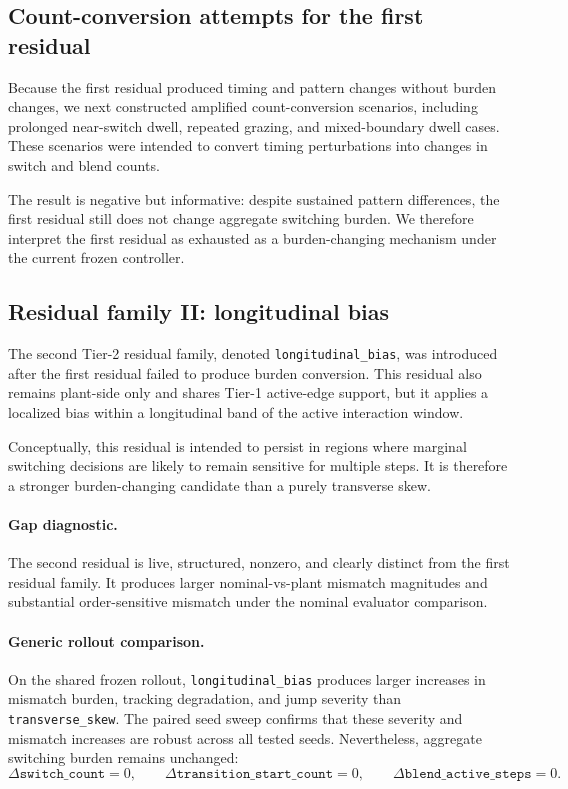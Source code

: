 \subsection{Count-conversion attempts for the first residual}
\label{subsec:tier2_count_conversion_attempt}

Because the first residual produced timing and pattern changes without burden changes, we next constructed amplified count-conversion scenarios, including prolonged near-switch dwell, repeated grazing, and mixed-boundary dwell cases. These scenarios were intended to convert timing perturbations into changes in switch and blend counts.

The result is negative but informative: despite sustained pattern differences, the first residual still does not change aggregate switching burden. We therefore interpret the first residual as exhausted as a burden-changing mechanism under the current frozen controller.

\subsection{Residual family II: longitudinal bias}
\label{subsec:tier2_longitudinal_bias}

The second Tier-2 residual family, denoted \texttt{longitudinal\_bias}, was introduced after the first residual failed to produce burden conversion. This residual also remains plant-side only and shares Tier-1 active-edge support, but it applies a localized bias within a longitudinal band of the active interaction window.

Conceptually, this residual is intended to persist in regions where marginal switching decisions are likely to remain sensitive for multiple steps. It is therefore a stronger burden-changing candidate than a purely transverse skew.

\paragraph{Gap diagnostic.}
The second residual is live, structured, nonzero, and clearly distinct from the first residual family. It produces larger nominal-vs-plant mismatch magnitudes and substantial order-sensitive mismatch under the nominal evaluator comparison.

\paragraph{Generic rollout comparison.}
On the shared frozen rollout, \texttt{longitudinal\_bias} produces larger increases in mismatch burden, tracking degradation, and jump severity than \texttt{transverse\_skew}. The paired seed sweep confirms that these severity and mismatch increases are robust across all tested seeds. Nevertheless, aggregate switching burden remains unchanged:
\[
\Delta \texttt{switch\_count}=0,\qquad
\Delta \texttt{transition\_start\_count}=0,\qquad
\Delta \texttt{blend\_active\_steps}=0.
\]

